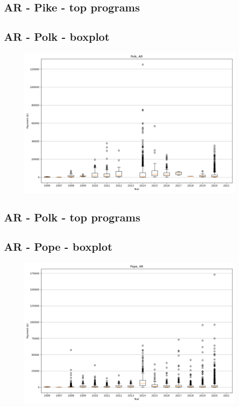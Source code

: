 \subsection*{AR - Pike - top programs}

\newpage
\subsection*{AR - Polk - boxplot}
\begin{figure}[h]
\centering
\includegraphics[width=7in]{../output/boxplots/counties/Polk-AR_boxplot.png}
\end{figure}


\subsection*{AR - Polk - top programs}

\newpage
\subsection*{AR - Pope - boxplot}
\begin{figure}[h]
\centering
\includegraphics[width=7in]{../output/boxplots/counties/Pope-AR_boxplot.png}
\end{figure}


